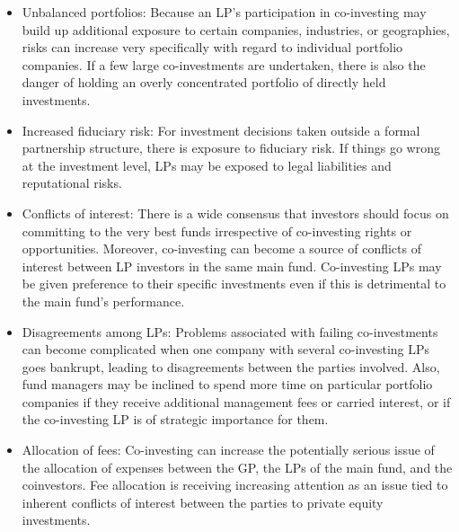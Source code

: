 \documentclass[11pt]{article}
\begin{document}
\begin{itemize}
  \item Unbalanced portfolios: Because an LP's participation in co-investing may build up additional exposure to certain companies, industries, or geographies, risks can increase very specifically with regard to individual portfolio companies. If a few large co-investments are undertaken, there is also the danger of holding an overly concentrated portfolio of directly held investments.
  \item Increased fiduciary risk: For investment decisions taken outside a formal partnership structure, there is exposure to fiduciary risk. If things go wrong at the investment level, LPs may be exposed to legal liabilities and reputational risks.
  \item Conflicts of interest: There is a wide consensus that investors should focus on committing to the very best funds irrespective of co-investing rights or opportunities. Moreover, co-investing can become a source of conflicts of interest between LP investors in the same main fund. Co-investing LPs may be given preference to their specific investments even if this is detrimental to the main fund's performance.
  \item Disagreements among LPs: Problems associated with failing co-investments can become complicated when one company with several co-investing LPs goes bankrupt, leading to disagreements between the parties involved. Also, fund managers may be inclined to spend more time on particular portfolio companies if they receive additional management fees or carried interest, or if the co-investing LP is of strategic importance for them.
  \item Allocation of fees: Co-investing can increase the potentially serious issue of the allocation of expenses between the GP, the LPs of the main fund, and the coinvestors. Fee allocation is receiving increasing attention as an issue tied to inherent conflicts of interest between the parties to private equity investments.
\end{itemize}
\end{document}
